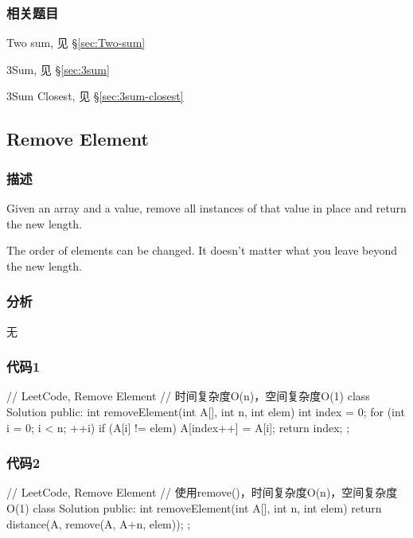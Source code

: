 \subsubsection{相关题目}
\begindot
\item Two sum, 见 \S \ref{sec:Two-sum}
\item 3Sum, 见 \S \ref{sec:3sum}
\item 3Sum Closest, 见 \S \ref{sec:3sum-closest}
\myenddot


\subsection{Remove Element} %
\label{sec:remove-element }


\subsubsection{描述}
Given an array and a value, remove all instances of that value in place and return the new length.

The order of elements can be changed. It doesn't matter what you leave beyond the new length.


\subsubsection{分析}
无


\subsubsection{代码1}
\begin{Code}
// LeetCode, Remove Element
// 时间复杂度O(n)，空间复杂度O(1)
class Solution {
public:
    int removeElement(int A[], int n, int elem) {
        int index = 0;
        for (int i = 0; i < n; ++i) {
            if (A[i] != elem) {
                A[index++] = A[i];
            }
        }
        return index;
    }
};
\end{Code}


\subsubsection{代码2}
\begin{Code}
// LeetCode, Remove Element
// 使用remove()，时间复杂度O(n)，空间复杂度O(1)
class Solution {
public:
    int removeElement(int A[], int n, int elem) {
        return distance(A, remove(A, A+n, elem));
    }
};
\end{Code}


